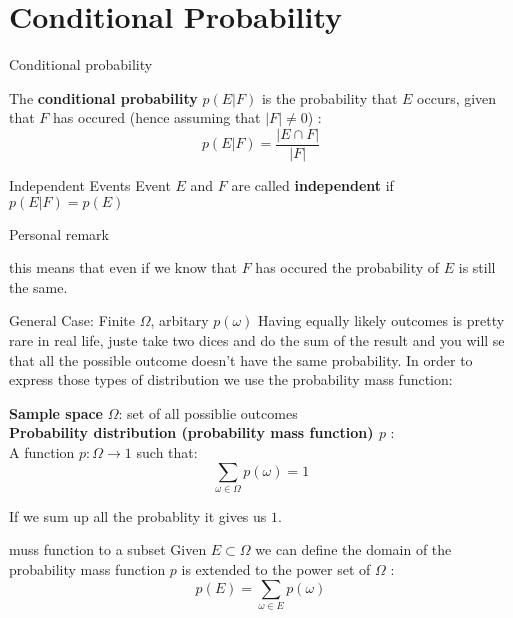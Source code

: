 \section{Conditional Probability}
\begin{parag}{Conditional probability}
    \begin{definition}
        The \textbf{conditional probability} $p(E|F)$ is the probability that $E$ occurs, given that $F$ has occured (hence assuming that $|F| \neq 0$) : 
        \[p(E|F) = \frac{|E \cap F|}{|F|}\]
    \end{definition}
\end{parag}
\begin{parag}{Independent Events}
    Event $E$ and $F$ are called \textbf{independent} if $p(E|F) = p(E)$
    \begin{subparag}{Personal remark}
        \begin{framedremark}
            this means that even if we know that $F$ has occured the probability of $E$ is still the same.
        \end{framedremark}
    \end{subparag}
\end{parag}
\begin{parag}{General Case: Finite $\Omega$, arbitary $p(\omega)$}
    Having equally likely outcomes is pretty rare in real life, juste take two dices and do the sum of the result and you will se that all the possible outcome doesn't have the same probability. In order to express those types of distribution we use the probability mass function:
    \begin{definition}
        \textbf{Sample space} $\Omega$: set of all possiblie outcomes
        \\
        \textbf{Probability distribution (probability mass function) $p$} : 
        \\
        A function $p : \Omega \to 1$ such that: 
        \[\sum_{\omega \in \Omega} p(\omega) = 1\]
    \end{definition}
    If we sum up all the probablity it gives us $1$.
     \begin{subparag}{muss function to a subset}
         Given $E \subset \Omega$ we can define the domain of the probability mass function $p$ is extended to the power set of $\Omega$ : 
         \[p(E) = \sum_{\omega \in E} p(\omega)\]
     \end{subparag}
\end{parag}

